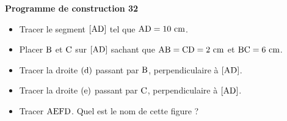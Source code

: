 \documentclass{article}
\begin{document}
\noindent\textbf{Programme de construction 32}\par\smallskip\noindent
\begin{itemize}
    \item Tracer le segment $[\text{AD}]$ tel que
    $\text{AD}=10\text{ cm}$.
    \item Placer $\text{B}$ et $\text{C}$ sur
    $[\text{AD}]$ sachant que
    $\text{AB}=\text{CD}=2\text{ cm}$ et
    $\text{BC}=6\text{ cm}$.
    \item Tracer la droite $(\text{d})$ passant par
    $\text{B}$, perpendiculaire à $[\text{AD}]$.
    \item Tracer la droite $(\text{e})$ passant par
    $\text{C}$, perpendiculaire à $[\text{AD}]$.
    \item Tracer $\text{AEFD}$. Quel est le nom de cette figure ?
\end{itemize}
\end{document}
